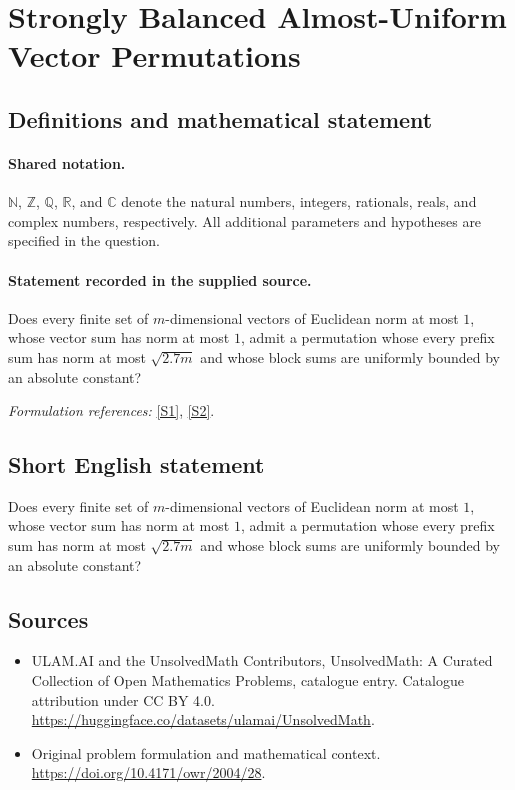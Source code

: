 \documentclass[11pt]{article}
\newcommand{\sref}[2]{\hyperlink{source:#1:#2}{[S#2]}}
\begin{document}
\section{Strongly Balanced Almost-Uniform Vector Permutations}\label{statement}

\subsection{Definitions and mathematical statement}

\paragraph{Shared notation.}$\mathbb N$, $\mathbb Z$, $\mathbb Q$, $\mathbb R$, and $\mathbb C$ denote the natural numbers, integers, rationals, reals, and complex numbers, respectively. All additional parameters and hypotheses are specified in the question.


\paragraph{Statement recorded in the supplied source.}
Does every finite set of $m$-dimensional vectors of Euclidean norm at most $1$, whose vector sum has norm at most $1$, admit a permutation whose every prefix sum has norm at most $\sqrt{2.7m}$ and whose block sums are uniformly bounded by an absolute constant?
\par\smallskip\textit{Formulation references:} \sref{statement}{1}, \sref{statement}{2}.
\subsection{Short English statement}
Does every finite set of $m$-dimensional vectors of Euclidean norm at most $1$, whose vector sum has norm at most $1$, admit a permutation whose every prefix sum has norm at most $\sqrt{2.7m}$ and whose block sums are uniformly bounded by an absolute constant?
\subsection{Sources}
\begin{itemize}
\item[\hypertarget{source:statement:1}{S1}] ULAM.AI and the UnsolvedMath Contributors, UnsolvedMath: A Curated Collection of Open Mathematics Problems, catalogue entry. Catalogue attribution under CC BY 4.0.
\url{https://huggingface.co/datasets/ulamai/UnsolvedMath}.
\item[\hypertarget{source:statement:2}{S2}] Original problem formulation and mathematical context.
\url{https://doi.org/10.4171/owr/2004/28}.
\end{itemize}
\label{end:statement}
\end{document}

